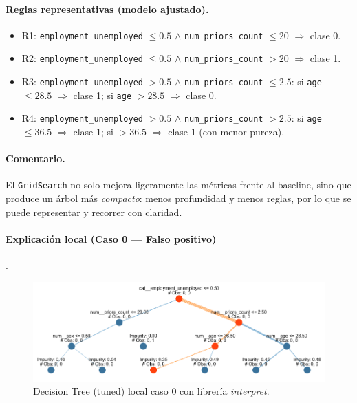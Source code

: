 \paragraph{Reglas representativas (modelo ajustado).}
\vspace{-0.4em}
\begin{itemize}
  \item R1: \texttt{employment\_unemployed} $\leq 0.5$ $\land$ \texttt{num\_priors\_count} $\leq 20$ $\Rightarrow$ clase 0.
  \item R2: \texttt{employment\_unemployed} $\leq 0.5$ $\land$ \texttt{num\_priors\_count} $> 20$ $\Rightarrow$ clase 1.
  \item R3: \texttt{employment\_unemployed} $> 0.5$ $\land$ \texttt{num\_priors\_count} $\leq 2.5$: 
        si \texttt{age} $\leq 28.5$ $\Rightarrow$ clase 1; si \texttt{age} $> 28.5$ $\Rightarrow$ clase 0.
  \item R4: \texttt{employment\_unemployed} $> 0.5$ $\land$ \texttt{num\_priors\_count} $> 2.5$: 
        si \texttt{age} $\leq 36.5$ $\Rightarrow$ clase 1; si $> 36.5$ $\Rightarrow$ clase 1 (con menor pureza).
\end{itemize}

\paragraph{Comentario.}
El \texttt{GridSearch} no solo mejora ligeramente las métricas frente al baseline, sino que produce un árbol más \emph{compacto}: menos profundidad y menos reglas, por lo que se puede representar y recorrer con claridad.

\paragraph{Explicación local (Caso 0 — Falso positivo)}.

\begin{figure}[h!]
  \centering
  \includegraphics[width=0.92\linewidth]{figures/decision_tree_tunned_depth_local0.png}
  \caption{Decision Tree (tuned) local caso 0 con librería \textit{interpret}.}
  \label{fig:tree-tuned_local0}
\end{figure}

